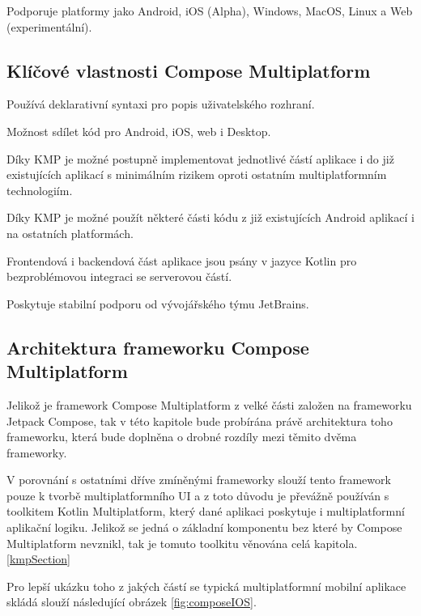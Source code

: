 Podporuje platformy jako Android, iOS (Alpha), Windows, MacOS, Linux a Web (experimentální). \cite{composeMultiplatform}

\medskip

\subsection*{Klíčové vlastnosti Compose Multiplatform}

Používá deklarativní syntaxi pro popis uživatelského rozhraní. \cite{KMPUseCases}

Možnost sdílet kód pro Android, iOS, web i Desktop.

Díky KMP je možné postupně implementovat jednotlivé částí aplikace i do již existujících aplikací s minimálním rizikem oproti
ostatním multiplatformním technologiím. \cite{KMP}

Díky KMP je možné použít některé části kódu z již existujících Android aplikací i na ostatních platformách.

Frontendová i backendová část aplikace jsou psány v jazyce Kotlin pro bezproblémovou integraci se serverovou částí.

Poskytuje stabilní podporu od vývojářského týmu JetBrains.

\subsection*{Architektura frameworku Compose Multiplatform}
Jelikož je framework Compose Multiplatform z velké části založen na frameworku Jetpack Compose, tak v této kapitole bude probírána
právě architektura toho frameworku, která bude doplněna o drobné rozdíly mezi těmito dvěma frameworky.

V porovnání s ostatními dříve zmíněnými frameworky slouží tento framework pouze k tvorbě multiplatformního UI a z toto důvodu je převážně 
používán s toolkitem Kotlin Multiplatform, který dané aplikaci poskytuje i multiplatformní aplikační logiku. Jelikož se jedná o základní 
komponentu bez které by Compose Multiplatform nevznikl, tak je tomuto toolkitu věnována celá kapitola. \ref{kmpSection}

Pro lepší ukázku toho z jakých částí se typická multiplatformní mobilní aplikace skládá slouží následující obrázek \ref{fig:composeIOS}.

